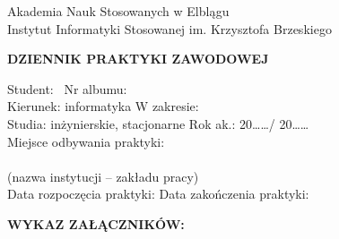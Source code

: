 \documentclass[11pt,a4paper]{article}
\begin{document}
\noindent
Akademia Nauk Stosowanych w Elblągu \\
Instytut Informatyki Stosowanej im. Krzysztofa Brzeskiego

\vspace{1.5em}
\begin{center}
\textbf{\large DZIENNIK PRAKTYKI ZAWODOWEJ}
\end{center}
\vspace{1em}

\noindent Student: \dotfill\ Nr albumu: \dotfill \\
Kierunek: informatyka \hfill W zakresie: \dotfill \\
Studia: inżynierskie, stacjonarne \hfill Rok ak.: 20\dots\dots / 20\dots\dots \\
Miejsce odbywania praktyki: \dotfill \\
\dotfill \\
{\small (nazwa instytucji – zakładu pracy)} \\[1.5em]
Data rozpoczęcia praktyki: \dotfill \hfill Data zakończenia praktyki: \dotfill

\vspace{1.5em}
\noindent \textbf{WYKAZ ZAŁĄCZNIKÓW:} \\
\dotfill \\
\dotfill 

\vspace{1.5em}

\renewcommand{\arraystretch}{2}
\end{document}
